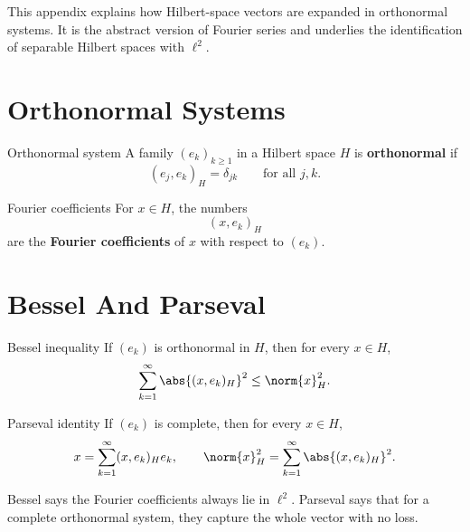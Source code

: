 \documentclass[11pt]{article}
\begin{document}

\vspace{0.8em}

\begin{focusbox}
This appendix explains how Hilbert-space vectors are expanded in orthonormal systems. It is the abstract version of Fourier series and underlies the identification of separable Hilbert spaces with $\ell^2$.
\end{focusbox}

\tableofcontents

\section{Orthonormal Systems}

\begin{defbox}{Orthonormal system}
A family $(e_k)_{k\ge 1}$ in a Hilbert space $H$ is \textbf{orthonormal} if
\[
(e_j,e_k)_H=\delta_{jk}
\qquad \text{for all } j,k.
\]
\end{defbox}

\begin{defbox}{Fourier coefficients}
For $x\in H$, the numbers
\[
(x,e_k)_H
\]
are the \textbf{Fourier coefficients} of $x$ with respect to $(e_k)$.
\end{defbox}

\section{Bessel And Parseval}

\begin{thmbox}{Bessel inequality}
If $(e_k)$ is orthonormal in $H$, then for every $x\in H$,
\[
\sum_{k=1}^{\infty}\abs{(x,e_k)_H}^2\le \norm{x}_H^2.
\]
\end{thmbox}

\begin{thmbox}{Parseval identity}
If $(e_k)$ is complete, then for every $x\in H$,
\[
x=\sum_{k=1}^{\infty}(x,e_k)_He_k,
\qquad
\norm{x}_H^2=\sum_{k=1}^{\infty}\abs{(x,e_k)_H}^2.
\]
\end{thmbox}

\begin{focusbox}
Bessel says the Fourier coefficients always lie in $\ell^2$. Parseval says that for a complete orthonormal system, they capture the whole vector with no loss.
\end{focusbox}
\end{document}
